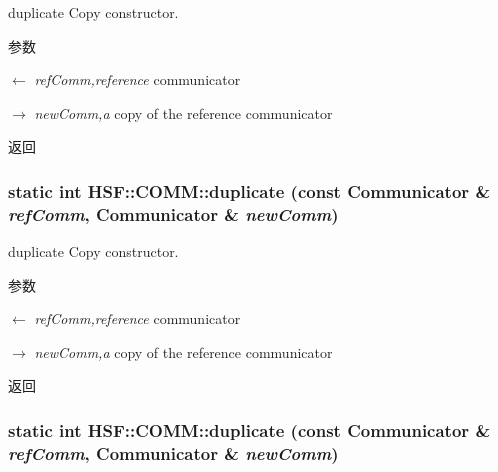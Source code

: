 duplicate Copy constructor. 
\begin{DoxyParams}{参数}
\item[\mbox{$\leftarrow$} {\em refComm,reference}]communicator \item[\mbox{$\rightarrow$} {\em newComm,a}]copy of the reference communicator \end{DoxyParams}
\begin{DoxyReturn}{返回}

\end{DoxyReturn}
\hypertarget{classHSF_1_1COMM_a093162ff2492f8f27d86cb998ff52f10}{
\subsubsection[{duplicate}]{\setlength{\rightskip}{0pt plus 5cm}static int HSF::COMM::duplicate (const {\bf Communicator} \& {\em refComm}, \/  {\bf Communicator} \& {\em newComm})}}
\label{classHSF_1_1COMM_a093162ff2492f8f27d86cb998ff52f10}


duplicate Copy constructor. 
\begin{DoxyParams}{参数}
\item[\mbox{$\leftarrow$} {\em refComm,reference}]communicator \item[\mbox{$\rightarrow$} {\em newComm,a}]copy of the reference communicator \end{DoxyParams}
\begin{DoxyReturn}{返回}

\end{DoxyReturn}
\hypertarget{classHSF_1_1COMM_a093162ff2492f8f27d86cb998ff52f10}{
\subsubsection[{duplicate}]{\setlength{\rightskip}{0pt plus 5cm}static int HSF::COMM::duplicate (const {\bf Communicator} \& {\em refComm}, \/  {\bf Communicator} \& {\em newComm})}}
\label{classHSF_1_1COMM_a093162ff2492f8f27d86cb998ff52f10}


